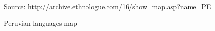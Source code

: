 \begin{figure}[!ht]
\begin{center}
\end{center}
\caption{Peruvian languages map}\label{Figcomp}
\raggedright
{\scriptsize Source: \url{http://archive.ethnologue.com/16/show_map.asp?name=PE}}
\end{figure}

